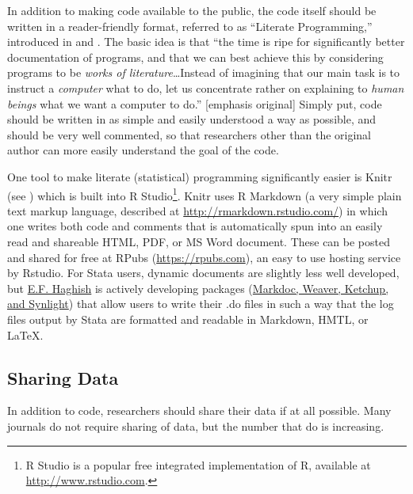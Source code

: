 \documentclass[12pt] {article}
\begin{document}
In addition to making code available to the public, the code itself
should be written in a reader-friendly format, referred to as ``Literate
Programming,'' introduced in \cite{knuth_literate_1984} and \cite{knuth_literate_1992}. The basic
idea is that ``the time is ripe for significantly better documentation
of programs, and that we can best achieve this by considering programs
to be \emph{works of literature}\ldots{}Instead of imagining that our
main task is to instruct a \emph{computer} what to do, let us
concentrate rather on explaining to \emph{human beings} what we want a
computer to do.'' {[}emphasis original{]} Simply put, code should be
written in as simple and easily understood a way as possible, and should
be very well commented, so that researchers other than the original
author can more easily understand the goal of the code.

One tool to make literate (statistical) programming significantly easier
is Knitr (see \cite{xie_dynamic_2013, xie_knitr:_2014}) which is built into R
Studio\footnote{R Studio is a popular free integrated implementation of
  R, available at \href{stylesWithEffects.xml}{http://www.rstudio.com}.}.
Knitr uses R Markdown (a very simple plain text markup language,
described at \url{http://rmarkdown.rstudio.com/}) in which one writes
both code and comments that is automatically spun into an easily read
and shareable HTML, PDF, or MS Word document. These can be posted and
shared for free at RPubs (\url{https://rpubs.com}), an easy to use
hosting service by Rstudio. For Stata users, dynamic documents are slightly less well developed, but \href{http://www.haghish.com}{E.F. Haghish} is actively developing packages (\href{http://www.haghish.com/statistics/stata-blog/reproducible-research/packages.php}{Markdoc, Weaver, Ketchup, and Synlight}) that allow users to write their .do files in such a way that the log files output by Stata are formatted and readable in Markdown, HMTL, or \LaTeX . 



\subsection{Sharing Data}\label{sharing-data}

In addition to code, researchers should share their data if at all
possible. Many journals do not require sharing of data, but the number
that do is increasing.
\end{document}

